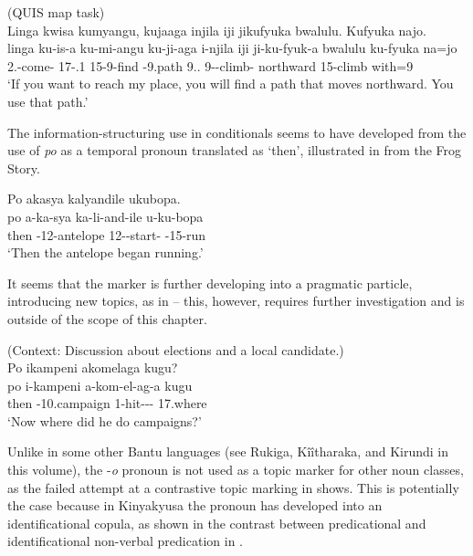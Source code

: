 \documentclass[output=paper]{langscibook}
\begin{document}
\ea
\label{bkm:Ref122595953}
(QUIS map task)\\
Linga kwisa kumyangu, kujaaga injila iji jikufyuka bwalulu. Kufyuka najo.\\
\gll
linga  ku-is-a  ku-mi-angu  ku-ji-aga  i-njila iji   ji-ku-fyuk-a  bwalulu  ku-fyuka  na=jo \\
\COND{}  2\SG.\SM{}-come-\FV{}  17-\POSS.1\SG{}  15-9\OM{}-find  \AUG{}-9.path 9.\DEM{}.\PROX{}   9\SM{}-\PRS{}-climb-\FV{}  northward  15-climb  with=9 \\
\glt
‘If you want to reach my place, you will find a path that moves northward. You use that path.’\\

\z

The information-structuring use in conditionals seems to have developed from the use of \textit{po} as a temporal pronoun translated as ‘then’, illustrated in  from the Frog Story.

\ea
\label{bkm:Ref123745644}
Po akasya kalyandile ukubopa.\\
\gll
po  a-ka-sya  ka-li-and-ile  u-ku-bopa\\
then  \AUG{}-12-antelope  12\SM-\PST{}-start-\PFV{}  \AUG{}-15-run\\
\glt
‘Then the antelope began running.’\\

\z


It seems that the marker is further developing into a pragmatic particle, introducing new topics, as in  – this, however, requires further investigation and is outside of the scope of this chapter.

\ea
\label{bkm:Ref123745954}
(Context: Discussion about elections and a local candidate.)\\
Po ikampeni akomelaga kugu?\\
\gll
po  i-kampeni  a-kom-el-ag-a  kugu\\
then  \AUG{}-10.campaign  1\SM{}-hit-\APPL-\HAB-\FV{}  17.where\\
\glt
‘Now where did he do campaigns?’\\

\z


Unlike in some other Bantu languages (see Rukiga, Kîîtharaka, and Kirundi in this volume), the -\textit{o} pronoun is not used as a topic marker for other noun classes, as the failed attempt at a contrastive topic marking in  shows. This is potentially the case because in Kinyakyusa the pronoun has developed into an identificational copula, as shown in the contrast between predicational and identificational non-verbal predication in .
\end{document}
